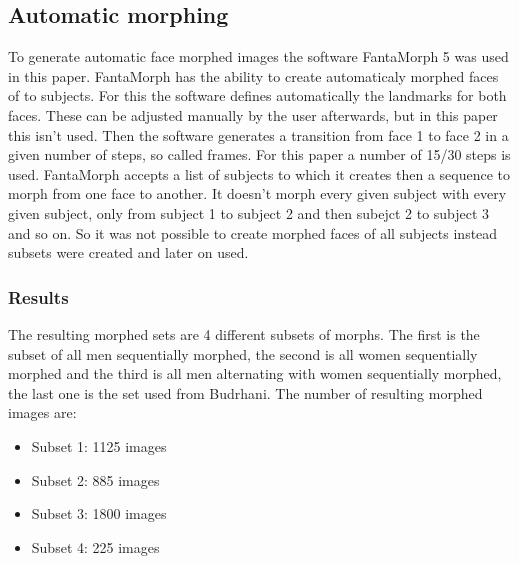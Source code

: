 \subsection{Automatic morphing}
\label{automatic_morph}
To generate automatic face morphed images the software FantaMorph 5 was used in this paper. FantaMorph has the ability to create automaticaly morphed faces of to subjects. For this the software defines automatically the landmarks for both faces. These can be adjusted manually by the user afterwards, but in this paper this isn't used. Then the software generates a transition from face 1 to face 2 in a given number of steps, so called frames. For this paper a number of 15/30 steps is used. FantaMorph accepts a list of subjects to which it creates then a sequence to morph from one face to another. It doesn't morph every given subject with every given subject, only from subject 1 to subject 2 and then subejct 2 to subject 3 and so on. So it was not possible to create morphed faces of all subjects instead subsets were created and later on used.

\subsubsection{Results}
The resulting morphed sets are 4 different subsets of morphs. The first is the subset of all men sequentially morphed, the second is all women sequentially morphed and the third is all men alternating with women sequentially morphed, the last one is the set used from Budrhani.
The number of resulting morphed images are:
\begin{itemize}
	\item Subset 1: 1125 images
	\item Subset 2: 885 images
	\item Subset 3: 1800 images
	\item Subset 4: 225 images
\end{itemize}


